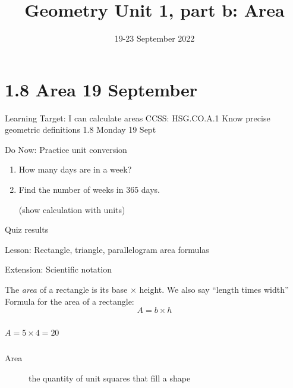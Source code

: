 

\title{Geometry Unit 1, part b: Area}
\date{19-23 September 2022}


\frame{\titlepage}

\section[Outline]{}
\frame{\tableofcontents}

\section{1.8 Area \hfill 19 September}
\begin{frame}{Learning Target: I can calculate areas}
  {CCSS: HSG.CO.A.1 Know precise geometric definitions \hfill \alert{1.8 Monday 19 Sept}}
  \begin{block}{Do Now: Practice unit conversion}
    \begin{enumerate}
        \item How many days are in a week?
        \item Find the number of weeks in 365 days. \par (show calculation with units)
    \end{enumerate}
    \end{block} \vspace{3cm}
    Quiz results \par \medskip
    Lesson: Rectangle, triangle, parallelogram area formulas \par \medskip
    Extension: Scientific notation
  \end{frame}

\begin{frame}{The \emph{area} of a rectangle is its base $\times$ height.}
    {We also say ``length times width''}
    Formula for the area of a rectangle:
    {\large $$A=b \times h$$}
        \begin{columns}
            $$A = 5 \times 4 = 20$$
        \end{columns} \vspace{1.5cm}
        \begin{description}
            \item[Area] the quantity of unit squares that fill a shape
        \end{description}
    \end{frame}

